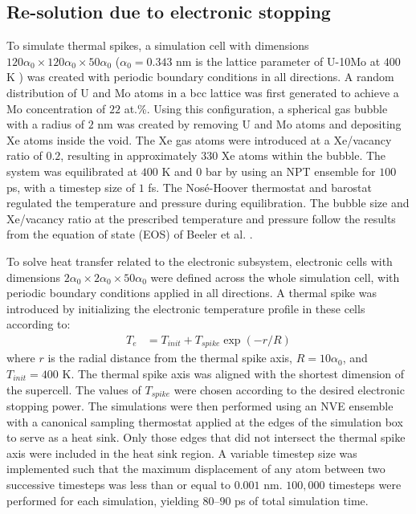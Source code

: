 \documentclass[review]{elsarticle}
\begin{document}
\subsection{Re-solution due to electronic stopping}
\label{sec:elec}

To simulate thermal spikes, a simulation cell with dimensions $120 \alpha_0 \times 120 \alpha_0 \times 50 \alpha_0$ ($\alpha_0 = 0.343$ nm is the lattice parameter of U-10Mo at $400$ K \cite{phillips2010}) was created with periodic boundary conditions in all directions. A random distribution of U and Mo atoms in a bcc lattice was first generated to achieve a Mo concentration of $22$ at.\%. Using this configuration, a spherical gas bubble with a radius of $2$ nm was created by removing U and Mo atoms and depositing Xe atoms inside the void. The Xe gas atoms were introduced at a Xe/vacancy ratio of $0.2$, resulting in approximately $330$ Xe atoms within the bubble. The system was equilibrated at $400$ K and $0$ bar by using an NPT ensemble for $100$ ps, with a timestep size of $1$ fs. The Nos\'e-Hoover thermostat and barostat regulated the temperature and pressure during equilibration. The bubble size and Xe/vacancy ratio at the prescribed temperature and pressure follow the results from the equation of state (EOS) of Beeler et al. \cite{beeler2020improved}.

To solve heat transfer related to the electronic subsystem, electronic cells with dimensions $2 \alpha_0 \times 2 \alpha_0 \times 50 \alpha_0$ were defined across the whole simulation cell, with periodic boundary conditions applied in all directions. A thermal spike was introduced by initializing the electronic temperature profile in these cells according to:
\begin{align}
	T_e &= T_{init} + T_{spike} \exp\left( -r / R \right)
\end{align}
where $r$ is the radial distance from the thermal spike axis, $R = 10 \alpha_0$, and $T_{init} = 400$ K. The thermal spike axis was aligned with the shortest dimension of the supercell. The values of $T_{spike}$ were chosen according to the desired electronic stopping power. The simulations were then performed using an NVE ensemble with a canonical sampling thermostat \cite{bussi2007} applied at the edges of the simulation box to serve as a heat sink. Only those edges that did not intersect the thermal spike axis were included in the heat sink region. A variable timestep size was implemented such that the maximum displacement of any atom between two successive timesteps was less than or equal to $0.001$ nm. $100,000$ timesteps were performed for each simulation, yielding $80$--$90$ ps of total simulation time.
\end{document}
